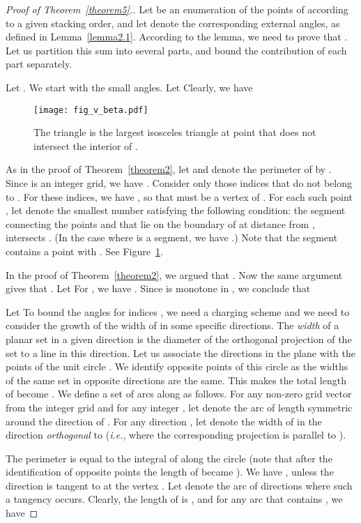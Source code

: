 \documentclass[11pt]{article}
\begin{document}
\begin{proof}[Proof of Theorem~\ref{theorem5}.]
Let  be an enumeration of the points of  according to a given stacking order, and let  denote the corresponding external angles, as defined in Lemma~\ref{lemma2.1}. According to the lemma, we need to prove that . Let us partition this sum into several parts, and bound the contribution of each part separately.

Let . We start with the small angles. Let
 Clearly, we have 

\begin{figure}
\centerline{\texttt{[image: fig\_v\_beta.pdf]}}
\caption{\label{fig_v_beta}The triangle  is the largest isosceles triangle at point  that does not intersect the interior of .}
\end{figure}

As in the proof of Theorem~\ref{theorem2}, let  and denote the perimeter of  by . Since  is an  integer grid, we have . Consider only those indices  that do not belong to . For these indices, we have , so that  must be a vertex of . For each such point , let  denote the smallest number satisfying the following condition: the segment connecting the points  and  that lie on the boundary of  at distance  from , intersects . (In the case where  is a segment, we have .) Note that the segment  contains a point  with .
See Figure~\ref{fig_v_beta}.

In the proof of Theorem~\ref{theorem2}, we argued that . Now the same
argument gives that . Let
 For , we have . Since  is
monotone in , we conclude that 

Let  To bound the angles 
for indices , we need a charging scheme and we need to consider the
growth of the width of  in some specific directions. The {\em width} of a
planar set in a given direction is the diameter of the orthogonal projection
of the set to a line in this direction. Let us associate the directions in the
plane with the points of the unit circle . We identify opposite points of
this circle as the widths of the same set in opposite
directions are the same. This makes the total length of  become . We
define a set of arcs along  as follows.
For any non-zero grid vector  from the integer grid and for any integer
, let  denote the arc of length  symmetric
around the direction of . For any direction , let
 denote the width of  in the direction {\em orthogonal} to
 ({\em i.e.}, where the corresponding projection is parallel to ).

The perimeter  is equal to the integral of  along the circle  (note that after the identification of opposite points the length of  became ). We have , unless the direction  is tangent to  at the vertex . Let  denote the arc of directions where such a tangency occurs. Clearly, the length of  is , and for any arc  that contains , we have



\end{proof}
\end{document}
